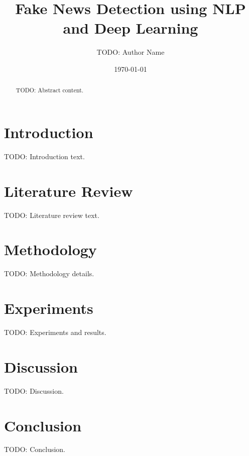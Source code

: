 \documentclass{report}
\title{Fake News Detection using NLP and Deep Learning}
\author{TODO: Author Name}
\date{\today}
\begin{document}
\maketitle
\begin{abstract}
TODO: Abstract content.
\end{abstract}
\tableofcontents
\chapter{Introduction}
TODO: Introduction text.
\chapter{Literature Review}
TODO: Literature review text.
\chapter{Methodology}
TODO: Methodology details.
\chapter{Experiments}
TODO: Experiments and results.
\chapter{Discussion}
TODO: Discussion.
\chapter{Conclusion}
TODO: Conclusion.


\end{document}
